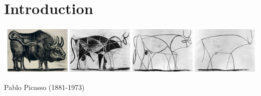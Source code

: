 \chapter{Introduction}\label{chap:intro}
\includegraphics[width=\textwidth]{Picasso-Bull-Progression-cropped.png}
\begin{flushright}
Pablo Picasso (1881-1973)\end{flushright}

\vspace{-7px}
